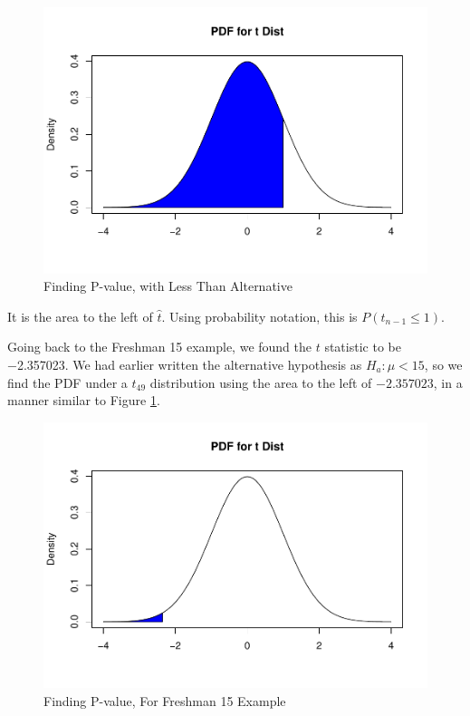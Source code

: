 \documentclass[
]{book}
\begin{document}
\begin{figure}
\centering
\includegraphics{bookdown-demo_files/figure-latex/9-pvalless-1.pdf}
\caption{\label{fig:9-pvalless}Finding P-value, with Less Than Alternative}
\end{figure}

It is the area to the left of \(\hat{t}\). Using probability notation, this is \(P( t_{n-1} \leq 1)\).

Going back to the Freshman 15 example, we found the \(t\) statistic to be −2.357023. We had earlier written the alternative hypothesis as \(H_a: \mu < 15\), so we find the PDF under a \(t_{49}\) distribution using the area to the left of \(-2.357023\), in a manner similar to Figure \ref{fig:9-pvalless}.

\begin{figure}
\centering
\includegraphics{bookdown-demo_files/figure-latex/9-pvaleg-1.pdf}
\caption{\label{fig:9-pvaleg}Finding P-value, For Freshman 15 Example}
\end{figure}
\end{document}
